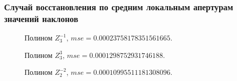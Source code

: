 \documentclass{article}
\begin{document}
\subsubsection{Случай восстановления по средним локальным апертурам значений наклонов}
\begin{figure}[H]
\caption{Полином $Z_3^{-1}$, $mse = 0.00023758178351561665$.}
\end{figure}

\begin{figure}[H]
\caption{Полином $Z_3^{3}$, $mse =0.0001298752931746188$.}
\end{figure}

\begin{figure}[H]
\caption{Полином $Z_2^{-2}$, $mse =0.00010995511181308096$.}
\end{figure}
\newpage
\end{document}
